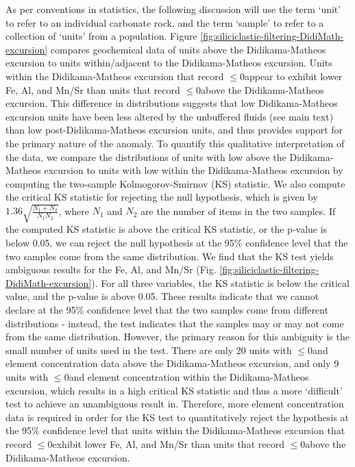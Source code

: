 As per conventions in statistics, the following discussion will use the term `unit' to refer to an individual carbonate rock, and the term `sample' to refer to a collection of `units' from a population. Figure \ref{fig:siliciclastic-filtering-DidiMath-excursion} compares geochemical data of units above the Didikama-Matheos excursion to units within/adjacent to the Didikama-Matheos excursion. Units within the Didikama-Matheos excursion that record \dC$\leq$0\permil appear to exhibit lower Fe, Al, and Mn/Sr than units that record \dC$\leq$0\permil above the Didikama-Matheos excursion. This difference in distributions suggests that low \dC Didikama-Matheos excursion units have been less altered by the unbuffered fluids (see main text) than low \dC post-Didikama-Matheos excursion units, and thus provides support for the primary nature of the anomaly. To quantify this qualitative interpretation of the data, we compare the distributions of units with low \dC above the Didikama-Matheos excursion to units with low \dC within the Didikama-Matheos excursion by computing the two-sample Kolmogorov-Smirnov (KS) statistic. We also compute the critical KS statistic for rejecting the null hypothesis, which is given by $1.36\sqrt{\frac{N_{1}+N_{2}}{N_{1}N_{2}}}$, where $N_{1}$ and $N_{2}$ are the number of items in the two samples. If the computed KS statistic is above the critical KS statistic, or the p-value is below 0.05, we can reject the null hypothesis at the 95\% confidence level that the two samples come from the same distribution. We find that the KS test yields ambiguous results for the Fe, Al, and Mn/Sr (Fig. \ref{fig:siliciclastic-filtering-DidiMath-excursion}). For all three variables, the KS statistic is below the critical value, and the p-value is above 0.05. These results indicate that we cannot declare at the 95\% confidence level that the two samples come from different distributions - instead, the test indicates that the samples may or may not come from the same distribution. However, the primary reason for this ambiguity is the small number of units used in the test. There are only 20 units with \dC$\leq$0\permil and element concentration data above the Didikama-Matheos excursion, and only 9 units with \dC$\leq$0\permil and element concentration within the Didikama-Matheos excursion, which results in a high critical KS statistic and thus a more `difficult' test to achieve an unambiguous result in. Therefore, more element concentration data is required in order for the KS test to quantitatively reject the hypothesis at the 95\% confidence level that units within the Didikama-Matheos excursion that record \dC$\leq$0\permil exhibit lower Fe, Al, and Mn/Sr than units that record \dC$\leq$0\permil above the Didikama-Matheos excursion.

